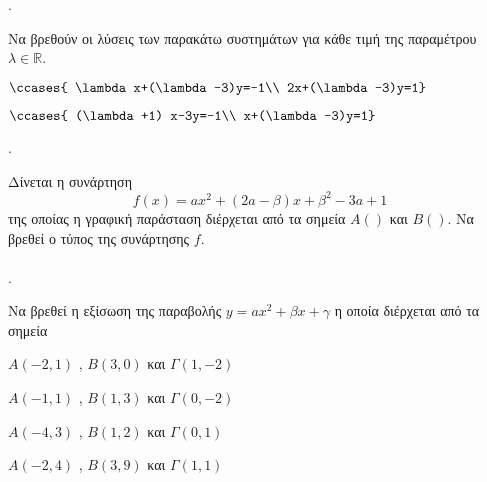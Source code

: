 \documentclass[11pt,a4paper,twocolumn]{article}
\newcounter{askhsh}
\newcommand{\askhsh}{\large\theaskhsh.\ \addtocounter{askhsh}{1}}
\begin{document}
\askhsh Να βρεθούν οι λύσεις των παρακάτω συστημάτων για κάθε τιμή της παραμέτρου $ \lambda\in\mathbb{R} $.
\begin{alist}
\item $\ccases{
\lambda x+(\lambda-3)y=-1\\
2x+(\lambda-3)y=1}$
\item $\ccases{
(\lambda+1) x-3y=-1\\
x+(\lambda-3)y=1}$
\end{alist}
\askhsh Δίνεται η συνάρτηση \[f(x)=ax^2+(2a-\beta) x+\beta^2-3a+1\] της οποίας η γραφική παράσταση διέρχεται από τα σημεία $A()$ και $B()$. Να βρεθεί ο τύπος της συνάρτησης $f$.\\\\
\askhsh Να βρεθεί η εξίσωση της παραβολής $ y=ax^2+\beta x+\gamma $ η οποία διέρχεται από τα σημεία
\begin{alist}
\item $ A(-2,1) $ , $ B(3,0) $ και $ \varGamma(1,-2) $
\item $ A(-1,1) $ , $ B(1,3) $ και $ \varGamma(0,-2) $
\item $ A(-4,3) $ , $ B(1,2) $ και $ \varGamma(0,1) $
\item $ A(-2,4) $ , $ B(3,9) $ και $ \varGamma(1,1) $
\end{alist}
\end{document}
